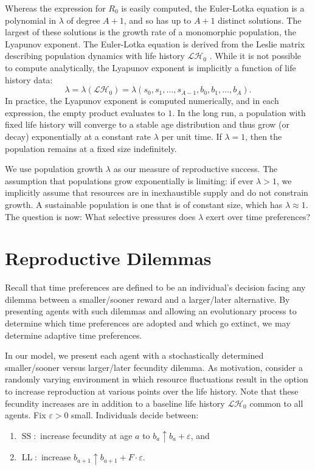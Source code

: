 \documentclass[titlepage, hidelinks, 12pt]{article}
\theoremstyle{plain}
\theoremstyle{remark}
\theoremstyle{definition}
\newcommand{\LH}{\mathcal{LH}}
\DeclareMathOperator{\smallersooner}{SS}
\DeclareMathOperator{\largerlater}{LL}
\begin{document}
Whereas the expression for $R_0$ is easily computed, the Euler-Lotka equation
is a polynomial in $\lambda$ of degree $A+1$, and so has up to $A+1$ distinct solutions. The largest of these solutions is the growth
rate of a monomorphic population, the Lyapunov exponent.
The Euler-Lotka equation is derived from the Leslie matrix describing population dynamics with life history $\LH_0$ \cite{stearns92}.
While it is not possible to compute analytically, the Lyapunov exponent is implicitly a function of life history data:
\begin{equation}
    \lambda = \lambda(\LH_0) = \lambda(s_0, s_1, \ldots, s_{A-1}, b_0, b_1, \ldots, b_{A}).
    \label{eqn:lambda_function}
\end{equation}
In practice, the Lyapunov exponent is computed numerically, and in each expression, the empty product evaluates to $1$. 
In the long run, a population with fixed life history will converge to a stable age distribution and
thus grow (or decay) 
exponentially at a constant rate $\lambda$ per unit time. If $\lambda = 1$, then the population remains at a fixed size indefinitely.

We use population growth $\lambda$ as our measure of reproductive success. The assumption that populations grow exponentially is limiting: if
ever $\lambda > 1$,  we implicitly assume that resources are in inexhaustible supply 
and do not constrain growth. A sustainable population is one that is of constant size, which has
$\lambda \approx 1$. The question is now: What selective pressures does $\lambda$ 
exert over time preferences?


\section{Reproductive Dilemmas}
Recall that time preferences are defined to be an individual's decision facing any dilemma between a smaller/sooner reward
and a larger/later alternative. By presenting agents with such dilemmas and allowing an evolutionary process to determine which
time preferences are adopted and which go extinct, we may determine adaptive time preferences. 

In our model, we present each agent with a stochastically determined
smaller/sooner versus larger/later fecundity dilemma.  As motivation, consider
a randomly varying environment in which resource fluctuations result in the option to
increase reproduction at various points over the life history. Note that these fecundity increases are in addition to a baseline life history
$\LH_0$ common to all agents.  
Fix $\varepsilon > 0$ small.  
Individuals decide between:
\begin{enumerate}
    \item $\smallersooner:$ increase fecundity at age $a$ to $b_a\uparrow b_{a} + \varepsilon$, and
    \item $\largerlater:$ increase $b_{a+1}\uparrow b_{a+1} + F\cdot \varepsilon$.
\end{enumerate}
\end{document}

